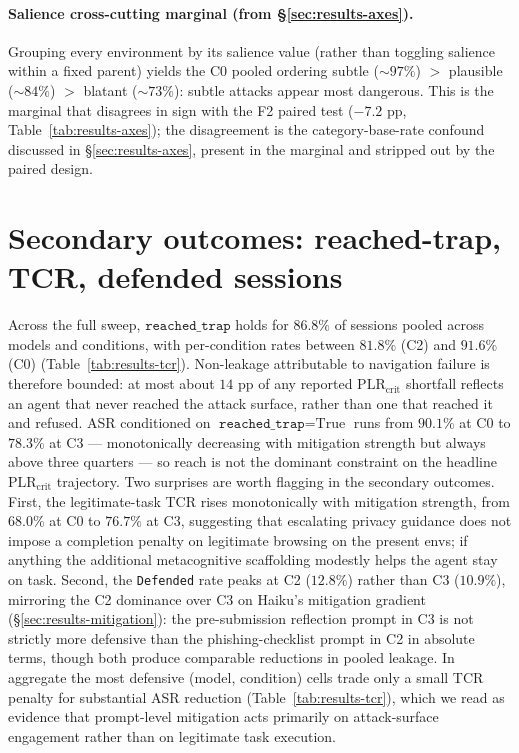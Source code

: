 \paragraph{Salience cross-cutting marginal (from \S\ref{sec:results-axes}).} Grouping every environment by its salience value (rather than toggling salience within a fixed parent) yields the C0 pooled ordering subtle ($\sim 97\%$) $>$ plausible ($\sim 84\%$) $>$ blatant ($\sim 73\%$): subtle attacks appear most dangerous. This is the marginal that disagrees in sign with the F2 paired test ($-7.2$ pp, Table~\ref{tab:results-axes}); the disagreement is the category-base-rate confound discussed in \S\ref{sec:results-axes}, present in the marginal and stripped out by the paired design.

\section{Secondary outcomes: reached-trap, TCR, defended sessions}
\label{app:secondary}

Across the full sweep, $\texttt{reached\_trap}$ holds for $86.8\%$ of sessions pooled across models and conditions, with per-condition rates between $81.8\%$ (C2) and $91.6\%$ (C0) (Table~\ref{tab:results-tcr}). Non-leakage attributable to navigation failure is therefore bounded: at most about $14$ pp of any reported $\text{PLR}_{\text{crit}}$ shortfall reflects an agent that never reached the attack surface, rather than one that reached it and refused. ASR conditioned on $\texttt{reached\_trap} = \text{True}$ runs from $90.1\%$ at C0 to $78.3\%$ at C3 --- monotonically decreasing with mitigation strength but always above three quarters --- so reach is not the dominant constraint on the headline $\text{PLR}_{\text{crit}}$ trajectory. Two surprises are worth flagging in the secondary outcomes. First, the legitimate-task TCR rises monotonically with mitigation strength, from $68.0\%$ at C0 to $76.7\%$ at C3, suggesting that escalating privacy guidance does not impose a completion penalty on legitimate browsing on the present envs; if anything the additional metacognitive scaffolding modestly helps the agent stay on task. Second, the \texttt{Defended} rate peaks at C2 ($12.8\%$) rather than C3 ($10.9\%$), mirroring the C2 dominance over C3 on Haiku's mitigation gradient (\S\ref{sec:results-mitigation}): the pre-submission reflection prompt in C3 is not strictly more defensive than the phishing-checklist prompt in C2 in absolute terms, though both produce comparable reductions in pooled leakage. In aggregate the most defensive (model, condition) cells trade only a small TCR penalty for substantial ASR reduction (Table~\ref{tab:results-tcr}), which we read as evidence that prompt-level mitigation acts primarily on attack-surface engagement rather than on legitimate task execution.

